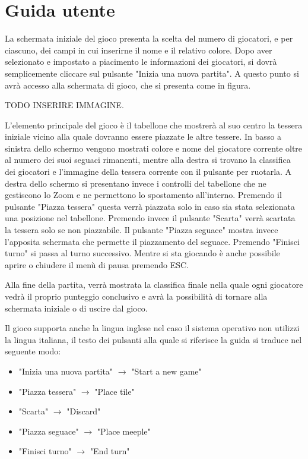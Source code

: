 \section{Guida utente}
La schermata iniziale del gioco presenta la scelta del numero di giocatori, e per ciascuno, dei campi in cui inserirne il nome e il relativo colore. Dopo aver selezionato e impostato a piacimento le informazioni dei giocatori, si dovrà semplicemente cliccare sul pulsante "Inizia una nuova partita". A questo punto si avrà accesso alla schermata di gioco, che si presenta come in figura.

TODO INSERIRE IMMAGINE.

L'elemento principale del gioco è il tabellone che mostrerà al suo centro la tessera iniziale vicino alla quale dovranno essere piazzate le altre tessere. In basso a sinistra dello schermo vengono mostrati colore e nome del giocatore corrente oltre al numero dei suoi seguaci rimanenti, mentre alla destra si trovano la classifica dei giocatori e l'immagine della tessera corrente con il pulsante per ruotarla. A destra dello schermo si presentano invece i controlli del tabellone che ne gestiscono lo Zoom e ne permettono lo spostamento all'interno. Premendo il pulsante "Piazza tessera" questa verrà piazzata solo in caso sia stata selezionata una posizione nel tabellone. Premendo invece il pulsante "Scarta" verrà scartata la tessera solo se non piazzabile. Il pulsante "Piazza seguace" mostra invece l'apposita schermata che permette il piazzamento del seguace. Premendo "Finisci turno" si passa al turno successivo. Mentre si sta giocando è anche possibile aprire o chiudere il menù di pausa premendo ESC.
\medskip

Alla fine della partita, verrà mostrata la classifica finale nella quale ogni giocatore vedrà il proprio punteggio conclusivo e avrà la possibilità di tornare alla schermata iniziale o di uscire dal gioco.
\medskip

Il gioco supporta anche la lingua inglese nel caso il sistema operativo non utilizzi la lingua italiana, il testo dei pulsanti alla quale si riferisce la guida si traduce nel seguente modo:
\begin{itemize}
    \item "Inizia una nuova partita" $\rightarrow$ "Start a new game"
    \item "Piazza tessera" $\rightarrow$ "Place tile"
    \item "Scarta" $\rightarrow$ "Discard"
    \item "Piazza seguace" $\rightarrow$ "Place meeple"
    \item "Finisci turno" $\rightarrow$ "End turn"
\end{itemize}
